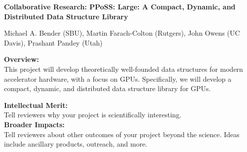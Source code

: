 
\begin{center}
\bf
\Large
Collaborative Research: PPoSS: Large: A Compact, Dynamic, and Distributed Data
Structure Library

\medskip
\small
Michael A. Bender (SBU), Martin Farach-Colton (Rutgers), John Owens (UC Davis),
Prashant Pandey (Utah)
\end{center}


\noindent \textbf{\large Overview:}\\

\noindent This project will develop theoretically well-founded data structures for modern accelerator hardware, with a focus on GPUs. Specifically, we will develop a compact, dynamic, and distributed data structure library for GPUs.


\noindent \textbf{\large Intellectual Merit:}\\

\noindent Tell reviewers why your project is scientifically interesting.\\

\noindent \textbf{\large Broader Impacts: }\\

\noindent Tell reviewers about other outcomes of your project beyond the science. Ideas include ancillary products, outreach, and more.
